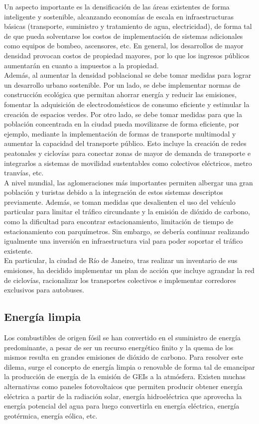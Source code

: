 \documentclass[runningheads]{llncs}
\begin{document}
Un aspecto importante es la densificación de las áreas existentes de forma inteligente y sostenible, alcanzando economías de escala en infraestructuras básicas (transporte, suministro y tratamiento de agua, electricidad), de forma tal de que pueda solventarse los costos de implementación de sistemas adicionales como equipos de bombeo, ascensores, etc. En general, los desarrollos de mayor densidad provocan costos de propiedad mayores, por lo que los ingresos públicos aumentarán en cuanto a impuestos a la propiedad.\\

Además, al aumentar la densidad poblacional se debe tomar medidas para lograr un desarrollo urbano sostenible. Por un lado, se debe implementar normas de construcción ecológica que permitan ahorrar energía y reducir las emisiones, fomentar la adquisición de electrodomésticos de consumo eficiente y estimular la creación de espacios verdes. Por otro lado, se debe tomar medidas para que la población concentrada en la ciudad pueda movilizarse de forma eficiente, por ejemplo, mediante la implementación de formas de transporte multimodal y aumentar la capacidad del transporte público. Esto incluye la creación de redes peatonales y ciclovías para conectar zonas de mayor de demanda de transporte e integrarlos a sistemas de movilidad sustentables como colectivos eléctricos, metro tranvías, etc.\\

A nivel mundial, las aglomeraciones más importantes permiten albergar una gran población y turistas debido a la integración de estos sistemas descriptos previamente. Además, se toman medidas que desalienten el uso del vehículo particular para limitar el tráfico circundante y la emisión de dióxido de carbono, como la dificultad para encontrar estacionamiento, limitación de tiempo de estacionamiento con parquímetros. Sin embargo, se debería continuar realizando igualmente una inversión en infraestructura vial para poder soportar el tráfico existente.~\cite{ref_book1}\\

En particular, la ciudad de Río de Janeiro, tras realizar un inventario de sus emisiones, ha decidido implementar un plan de acción que incluye agrandar la red de ciclovías, racionalizar los transportes colectivos e implementar corredores exclusivos para autobuses.~\cite{ref_url1}

\subsection{Energía limpia}
Los combustibles de origen fósil se han convertido en el suministro de energía predominante, a pesar de ser un recurso energético finito y la quema de los mismos resulta en grandes emisiones de dióxido de carbono. Para resolver este dilema, surge el concepto de energía limpia o renovable de forma tal de emancipar la producción de energía de la emisión de GEIs a la atmósfera. Existen muchas alternativas como paneles fotovoltaicos que permiten producir obtener energía eléctrica a partir de la radiación solar, energía hidroeléctrica que aprovecha la energía potencial del agua para luego convertirla en energía eléctrica, energía geotérmica, energía eólica, etc.\\
\end{document}
